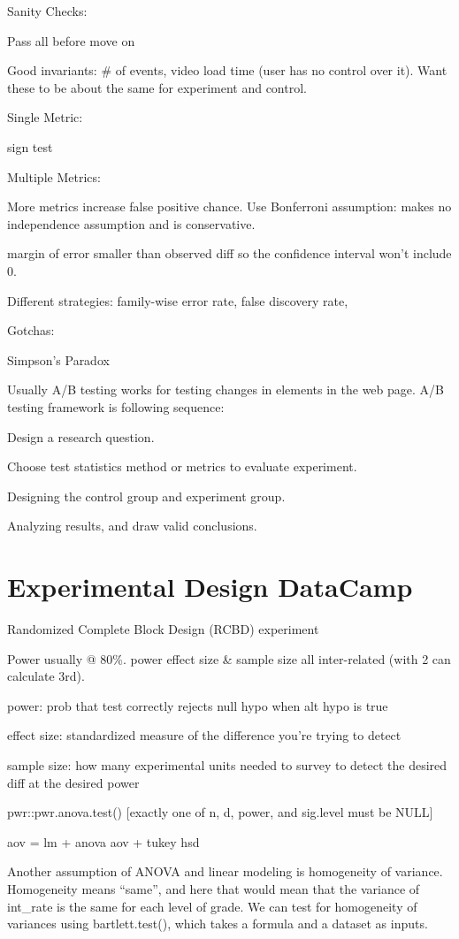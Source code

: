 \documentclass[]{book}
\begin{document}
Sanity Checks:

Pass all before move on

Good invariants: \# of events, video load time (user has no control over
it). Want these to be about the same for experiment and control.

Single Metric:

sign test

Multiple Metrics:

More metrics increase false positive chance. Use Bonferroni assumption:
makes no independence assumption and is conservative.

margin of error smaller than observed diff so the confidence interval
won't include 0.

Different strategies: family-wise error rate, false discovery rate,

Gotchas:

Simpson's Paradox

Usually A/B testing works for testing changes in elements in the web
page. A/B testing framework is following sequence:

Design a research question.

Choose test statistics method or metrics to evaluate experiment.

Designing the control group and experiment group.

Analyzing results, and draw valid conclusions.

\section{Experimental Design
DataCamp}\label{experimental-design-datacamp}

Randomized Complete Block Design (RCBD) experiment

Power usually @ 80\%. power effect size \& sample size all inter-related
(with 2 can calculate 3rd).

power: prob that test correctly rejects null hypo when alt hypo is true

effect size: standardized measure of the difference you're trying to
detect

sample size: how many experimental units needed to survey to detect the
desired diff at the desired power

pwr::pwr.anova.test() {[}exactly one of n, d, power, and sig.level must
be NULL{]}

aov = lm + anova \textbar{} aov + tukey hsd

Another assumption of ANOVA and linear modeling is homogeneity of
variance. Homogeneity means ``same'', and here that would mean that the
variance of int\_rate is the same for each level of grade. We can test
for homogeneity of variances using bartlett.test(), which takes a
formula and a dataset as inputs.
\end{document}
